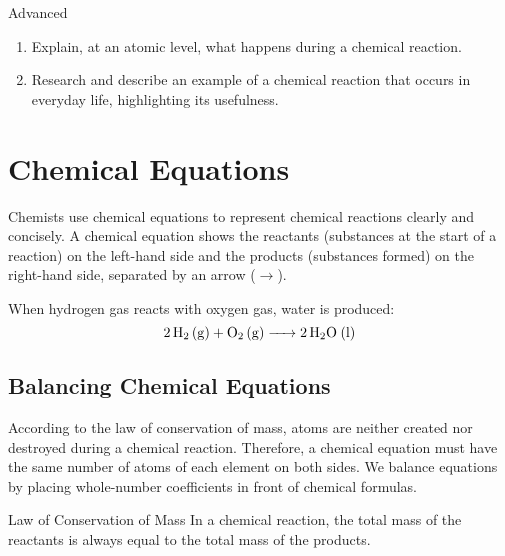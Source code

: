 \begin{tieredquestions}{Advanced}
\begin{enumerate}
    \item Explain, at an atomic level, what happens during a chemical reaction.
    \item Research and describe an example of a chemical reaction that occurs in everyday life, highlighting its usefulness.
\end{enumerate}
\end{tieredquestions}

\section{Chemical Equations}

Chemists use chemical equations to represent chemical reactions clearly and concisely. A chemical equation shows the reactants (substances at the start of a reaction) on the left-hand side and the products (substances formed) on the right-hand side, separated by an arrow (\(\rightarrow\)).

\begin{example}
When hydrogen gas reacts with oxygen gas, water is produced:
\[
\ce{2H2 (g) + O2 (g) -> 2H2O (l)}
\]
\end{example}


\subsection{Balancing Chemical Equations}

According to the law of conservation of mass, atoms are neither created nor destroyed during a chemical reaction. Therefore, a chemical equation must have the same number of atoms of each element on both sides. We balance equations by placing whole-number coefficients in front of chemical formulas.

\begin{keyconcept}{Law of Conservation of Mass}
In a chemical reaction, the total mass of the reactants is always equal to the total mass of the products.
\end{keyconcept}

